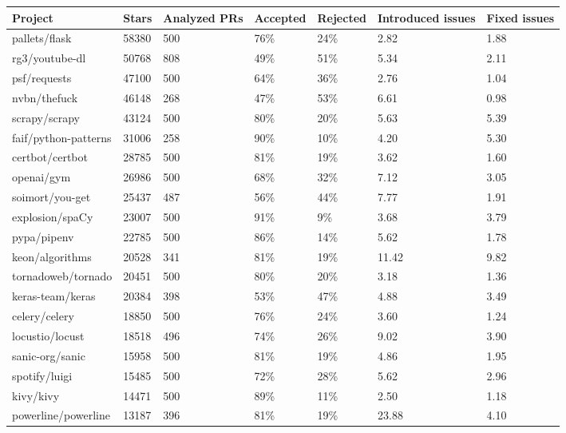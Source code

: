 \begin{tabular}{|p{3.5cm}p{1.5cm}p{1.5cm}p{1.5cm}p{1.5cm}p{1.5cm}p{1cm}|}
  \hline
Project & Stars & Analyzed PRs & Accepted & Rejected & Introduced issues & Fixed issues \\ 
  \hline \hline
pallets/flask & 58380 & 500 & 76\% & 24\% & 2.82 & 1.88 \\ 
  rg3/youtube-dl & 50768 & 808 & 49\% & 51\% & 5.34 & 2.11 \\ 
  psf/requests & 47100 & 500 & 64\% & 36\% & 2.76 & 1.04 \\ 
  nvbn/thefuck & 46148 & 268 & 47\% & 53\% & 6.61 & 0.98 \\ 
  scrapy/scrapy & 43124 & 500 & 80\% & 20\% & 5.63 & 5.39 \\ 
  faif/python-patterns & 31006 & 258 & 90\% & 10\% & 4.20 & 5.30 \\ 
  certbot/certbot & 28785 & 500 & 81\% & 19\% & 3.62 & 1.60 \\ 
  openai/gym & 26986 & 500 & 68\% & 32\% & 7.12 & 3.05 \\ 
  soimort/you-get & 25437 & 487 & 56\% & 44\% & 7.77 & 1.91 \\ 
  explosion/spaCy & 23007 & 500 & 91\% & 9\% & 3.68 & 3.79 \\ 
  pypa/pipenv & 22785 & 500 & 86\% & 14\% & 5.62 & 1.78 \\ 
  keon/algorithms & 20528 & 341 & 81\% & 19\% & 11.42 & 9.82 \\ 
  tornadoweb/tornado & 20451 & 500 & 80\% & 20\% & 3.18 & 1.36 \\ 
  keras-team/keras & 20384 & 398 & 53\% & 47\% & 4.88 & 3.49 \\ 
  celery/celery & 18850 & 500 & 76\% & 24\% & 3.60 & 1.24 \\ 
  locustio/locust & 18518 & 496 & 74\% & 26\% & 9.02 & 3.90 \\ 
  sanic-org/sanic & 15958 & 500 & 81\% & 19\% & 4.86 & 1.95 \\ 
  spotify/luigi & 15485 & 500 & 72\% & 28\% & 5.62 & 2.96 \\ 
  kivy/kivy & 14471 & 500 & 89\% & 11\% & 2.50 & 1.18 \\ 
  powerline/powerline & 13187 & 396 & 81\% & 19\% & 23.88 & 4.10 \\ 
   \hline
\end{tabular}
